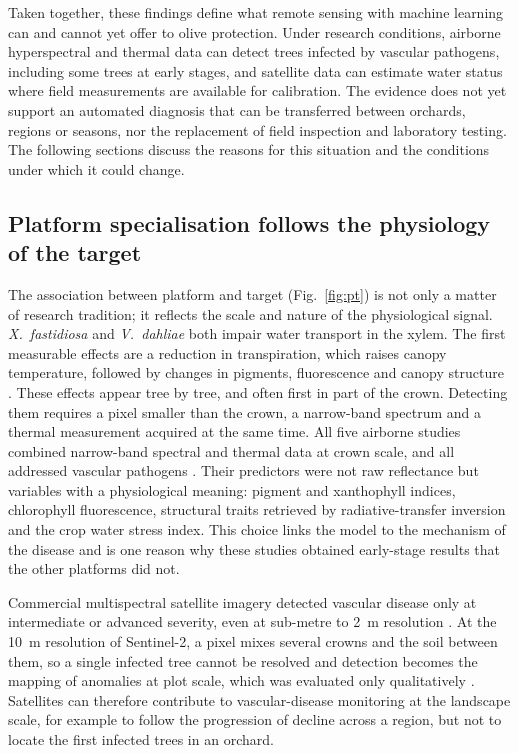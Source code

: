 \documentclass[preprint,12pt]{elsarticle}
\begin{document}
Taken together, these findings define what remote sensing with machine learning can and cannot yet offer to olive protection. Under research conditions, airborne hyperspectral and thermal data can detect trees infected by vascular pathogens, including some trees at early stages, and satellite data can estimate water status where field measurements are available for calibration. The evidence does not yet support an automated diagnosis that can be transferred between orchards, regions or seasons, nor the replacement of field inspection and laboratory testing. The following sections discuss the reasons for this situation and the conditions under which it could change.

\subsection{Platform specialisation follows the physiology of the target}\label{sec:disc_platform}
The association between platform and target (Fig.~\ref{fig:pt}) is not only a matter of research tradition; it reflects the scale and nature of the physiological signal. \textit{X.~fastidiosa} and \textit{V.~dahliae} both impair water transport in the xylem. The first measurable effects are a reduction in transpiration, which raises canopy temperature, followed by changes in pigments, fluorescence and canopy structure \citep{Mahlein2016Plant,Thomas2018Benefits}. These effects appear tree by tree, and often first in part of the crown. Detecting them requires a pixel smaller than the crown, a narrow-band spectrum and a thermal measurement acquired at the same time. All five airborne studies combined narrow-band spectral and thermal data at crown scale, and all addressed vascular pathogens \citep{u002,u008,u030,u113,u121}. Their predictors were not raw reflectance but variables with a physiological meaning: pigment and xanthophyll indices, chlorophyll fluorescence, structural traits retrieved by radiative-transfer inversion and the crop water stress index. This choice links the model to the mechanism of the disease and is one reason why these studies obtained early-stage results that the other platforms did not.

Commercial multispectral satellite imagery detected vascular disease only at intermediate or advanced severity, even at sub-metre to 2~m resolution \citep{u056}. At the 10~m resolution of Sentinel-2, a pixel mixes several crowns and the soil between them, so a single infected tree cannot be resolved and detection becomes the mapping of anomalies at plot scale, which was evaluated only qualitatively \citep{kallel2022olive}. Satellites can therefore contribute to vascular-disease monitoring at the landscape scale, for example to follow the progression of decline across a region, but not to locate the first infected trees in an orchard.
\end{document}
